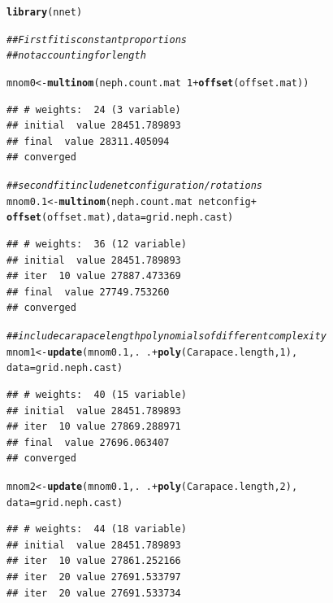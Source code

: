 \documentclass[12pt]{article}\usepackage[]{graphicx}\usepackage[]{color}
\makeatletter
\newcommand{\hlnum}[1]{\textcolor[rgb]{0.686,0.059,0.569}{#1}}%
\newcommand{\hlcom}[1]{\textcolor[rgb]{0.678,0.584,0.686}{\textit{#1}}}%
\newcommand{\hlopt}[1]{\textcolor[rgb]{0,0,0}{#1}}%
\newcommand{\hlstd}[1]{\textcolor[rgb]{0.345,0.345,0.345}{#1}}%
\newcommand{\hlkwb}[1]{\textcolor[rgb]{0.69,0.353,0.396}{#1}}%
\newcommand{\hlkwc}[1]{\textcolor[rgb]{0.333,0.667,0.333}{#1}}%
\newcommand{\hlkwd}[1]{\textcolor[rgb]{0.737,0.353,0.396}{\textbf{#1}}}%
\newenvironment{kframe}{%
 \def\at@end@of@kframe{}%
 \ifinner\ifhmode%
  \def\at@end@of@kframe{\end{minipage}}%
  \begin{minipage}{\columnwidth}%
 \fi\fi%
 \def\FrameCommand##1{\hskip\@totalleftmargin \hskip-\fboxsep
 \colorbox{shadecolor}{##1}\hskip-\fboxsep
     \hskip-\linewidth \hskip-\@totalleftmargin \hskip\columnwidth}%
 \MakeFramed {\advance\hsize-\width
   \@totalleftmargin\z@ \linewidth\hsize
   \@setminipage}}%
 {\par\unskip\endMakeFramed%
 \at@end@of@kframe}
\newenvironment{knitrout}{}{} %
\makeatother
\begin{document}
\begin{knitrout}\footnotesize
{}\color{fgcolor}\begin{kframe}
\begin{alltt}
\hlkwd{library}\hlstd{(nnet)}

\hlcom{## First fit is constant proportions}
\hlcom{## not accounting for length}

\hlstd{mnom0} \hlkwb{<-} \hlkwd{multinom}\hlstd{(neph.count.mat} \hlopt{~} \hlnum{1} \hlopt{+} \hlkwd{offset}\hlstd{(offset.mat))}
\end{alltt}
\begin{verbatim}
## # weights:  24 (3 variable)
## initial  value 28451.789893 
## final  value 28311.405094 
## converged
\end{verbatim}
\begin{alltt}
\hlcom{## second fit include net configuration/rotations}
\hlstd{mnom0.1} \hlkwb{<-} \hlkwd{multinom}\hlstd{(neph.count.mat} \hlopt{~} \hlstd{netconfig} \hlopt{+}
                    \hlkwd{offset}\hlstd{(offset.mat),} \hlkwc{data} \hlstd{= grid.neph.cast)}
\end{alltt}
\begin{verbatim}
## # weights:  36 (12 variable)
## initial  value 28451.789893 
## iter  10 value 27887.473369
## final  value 27749.753260 
## converged
\end{verbatim}
\begin{alltt}
\hlcom{## include carapace length polynomials of different complexity}
\hlstd{mnom1} \hlkwb{<-} \hlkwd{update}\hlstd{(mnom0.1, .} \hlopt{~} \hlstd{.} \hlopt{+} \hlkwd{poly}\hlstd{(Carapace.length,} \hlnum{1}\hlstd{),}
                \hlkwc{data} \hlstd{= grid.neph.cast)}
\end{alltt}
\begin{verbatim}
## # weights:  40 (15 variable)
## initial  value 28451.789893 
## iter  10 value 27869.288971
## final  value 27696.063407 
## converged
\end{verbatim}
\begin{alltt}
\hlstd{mnom2} \hlkwb{<-} \hlkwd{update}\hlstd{(mnom0.1, .} \hlopt{~} \hlstd{.} \hlopt{+} \hlkwd{poly}\hlstd{(Carapace.length,} \hlnum{2}\hlstd{),}
                \hlkwc{data} \hlstd{= grid.neph.cast)}
\end{alltt}
\begin{verbatim}
## # weights:  44 (18 variable)
## initial  value 28451.789893 
## iter  10 value 27861.252166
## iter  20 value 27691.533797
## iter  20 value 27691.533734

\end{verbatim}
\end{kframe}
\end{knitrout}
\end{document}

